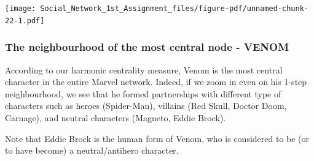 \documentclass[
  letterpaper,
  DIV=11,
  numbers=noendperiod]{scrartcl}
\newenvironment{Shaded}{\begin{snugshade}}{\end{snugshade}}
\newcommand{\AttributeTok}[1]{\textcolor[rgb]{0.40,0.45,0.13}{#1}}
\newcommand{\CommentTok}[1]{\textcolor[rgb]{0.37,0.37,0.37}{#1}}
\newcommand{\DecValTok}[1]{\textcolor[rgb]{0.68,0.00,0.00}{#1}}
\newcommand{\FunctionTok}[1]{\textcolor[rgb]{0.28,0.35,0.67}{#1}}
\newcommand{\NormalTok}[1]{\textcolor[rgb]{0.00,0.23,0.31}{#1}}
\newcommand{\OtherTok}[1]{\textcolor[rgb]{0.00,0.23,0.31}{#1}}
\newcommand{\SpecialCharTok}[1]{\textcolor[rgb]{0.37,0.37,0.37}{#1}}
\newcommand{\StringTok}[1]{\textcolor[rgb]{0.13,0.47,0.30}{#1}}
\begin{document}
\begin{Shaded}
\end{Shaded}

\texttt{[image: Social\_Network\_1st\_Assignment\_files/figure-pdf/unnamed-chunk-22-1.pdf]}

\subsubsection{The neighbourhood of the most central node -
VENOM}\label{the-neighbourhood-of-the-most-central-node---venom}

According to our harmonic centrality measure, Venom is the most central
character in the entire Marvel network. Indeed, if we zoom in even on
his 1-step neighbourhood, we see that he formed partnerships with
different type of characters such as heroes (Spider-Man), villains (Red
Skull, Doctor Doom, Carnage), and neutral characters (Magneto, Eddie
Brock).

Note that Eddie Brock is the human form of Venom, who is considered to
be (or to have become) a neutral/antihero character.
\end{document}
